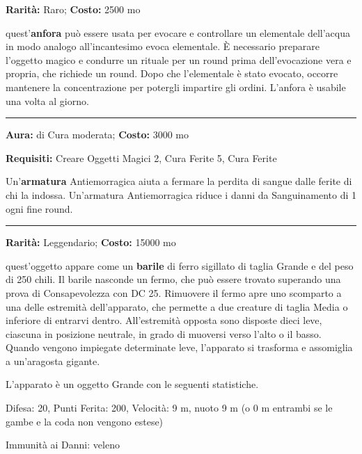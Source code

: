 \begin{multicols}{2}
\textbf{Rarità:} Raro; \textbf{Costo:} 2500 mo

quest'\textbf{anfora} può essere usata per evocare e controllare un elementale dell'acqua in modo analogo all'incantesimo evoca elementale. È necessario preparare l'oggetto magico e condurre un rituale per un round prima dell'evocazione vera e propria, che richiede un round. Dopo che l'elementale è stato evocato, occorre mantenere la concentrazione per potergli impartire gli ordini. L'anfora è usabile una volta al giorno.

\smallskip\noindent\rule{\linewidth}{2pt}  \hypertarget{Antiemorragica}{}\smallskip{}\noindent\label{Antiemorragica}

\textbf{Aura:} di Cura moderata; \textbf{Costo:} 3000 mo

\textbf{Requisiti:} Creare Oggetti Magici 2, Cura Ferite 5, Cura Ferite

Un'\textbf{armatura} Antiemorragica aiuta a fermare la perdita di sangue dalle ferite di chi la indossa. Un'armatura Antiemorragica riduce i danni da Sanguinamento di 1 ogni fine round.

\smallskip\noindent\rule{\linewidth}{2pt}  \hypertarget{ApparatodelGranchio}{}\smallskip{}\noindent\label{ApparatodelGranchio}

\textbf{Rarità:} Leggendario; \textbf{Costo:} 15000 mo

quest'oggetto appare come un \textbf{barile} di ferro sigillato di taglia Grande e del peso di 250 chili. Il barile nasconde un fermo, che può essere trovato superando una prova di Consapevolezza con DC 25. Rimuovere il fermo apre uno scomparto a una delle estremità dell'apparato, che permette a due creature di taglia Media o inferiore di entrarvi dentro. All'estremità opposta sono disposte dieci leve, ciascuna in posizione neutrale, in grado di muoversi verso l'alto o il basso. Quando vengono impiegate determinate leve, l'apparato si trasforma e assomiglia a un'aragosta gigante.

L'apparato è un oggetto Grande con le seguenti statistiche.

Difesa: 20, Punti Ferita: 200, Velocità: 9 m, nuoto 9 m (o 0 m entrambi se le gambe e la coda non vengono estese)

Immunità ai Danni: veleno


\end{multicols}
